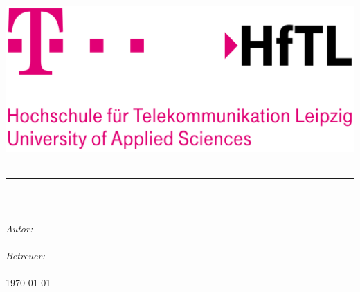 \thispagestyle{plain}

\begin{titlepage} 
	\begin{center}
		\uni
		\\[1cm]
		\includegraphics[scale=0.075]{../images/hftl_logo} \\
		[0.5cm]
		\art
		\\[0.7cm]
		\hrule
		\vspace{0,5cm}
		{\huge \textsc{\titel}} %
		\\[0,9cm] 
		\hrule
		\vspace{1,5cm}
				\large \emph{Autor:}\\
				\autor \\
				\vspace{\baselineskip} %
				\large \emph{Betreuer:} \\ 
				\betreuera \\ 
				\betreuerb
		\vfill %
		{\large \today} 
	\end{center}
\end{titlepage}
\thispagestyle{empty}
\cleardoublepage